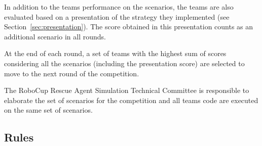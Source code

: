 \documentclass{article}
\begin{document}
In addition to the teams performance on the scenarios, the teams are also evaluated based on a presentation of the strategy they implemented (see Section~\ref{sec:presentation}). The score obtained in this presentation counts as an additional scenario in all rounds.

At the end of each round, a set of teams with the highest sum of scores considering all the scenarios (including the presentation score) are selected to move to the next round of the competition.

The RoboCup Rescue Agent Simulation Technical Committee is responsible to elaborate the set of scenarios for the competition and all teams code are executed on the same set of scenarios.
\subsection{Rules}
\label{sec:rules}
\end{document}
